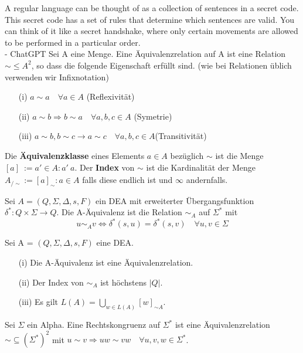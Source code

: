 {
  A regular language can be thought of as a collection of sentences in a secret code. This secret code has a set of rules that determine which sentences are valid. You can think of it like a secret handshake, where only certain movements are allowed to be performed in a particular order.\\ \hspace*{\fill} - ChatGPT
}
  Sei A eine Menge. Eine Äquivalenzrelation auf A ist eine Relation \(\sim \leq A^{2}\), so dass die folgende Eigenschaft erfüllt sind. (wie bei Relationen üblich verwenden wir Infixnotation)
  \begin{itemize}
    \item [(i)] \(a \sim a \quad \forall a \in A\)  (Reflexivität)
    \item [(ii)] \(a \sim b \Rightarrow  b \sim a \quad \forall a, b, c \in A\) (Symetrie)
    \item [(iii)] \(a \sim b, b \sim c \rightarrow a \sim c \quad \forall a, b, c \in A\)(Transitivität)
  \end{itemize}
  Die \textbf{Äquivalenzklasse} eines Elements \(a \in A\) bezüglich \(\sim\) ist die Menge \([a]_{~} := {a' \in A : a' ~a}\). Der \textbf{Index} von \(\sim\) ist die Kardinalität der Menge \(A_{/\sim} := {[a]_{\sim} : a \in A}\) falls diese endlich ist und \(\infty\) andernfalls.

  Sei \(A = (Q, \Sigma, \Delta, s, F)\) ein DEA mit erweiterter Übergangsfunktion \(\delta^{*}: Q \times \Sigma \rightarrow Q\). Die A-Äquivalenz ist die Relation \(\sim_A\) auf \(\Sigma^{*}\) mit 
\[
  u \sim_A v \Leftrightarrow \delta^*(s, u) = \delta^*(s,v) \quad \forall u, v \in \Sigma
\]

Sei A = \((Q, \Sigma, \Delta, s, F)\) eine DEA.
\begin{itemize}
  \item [(i)] Die A-Äquivalenz ist eine Äquivalenzrelation.
  \item [(ii)] Der Index von \(\sim_{A}\) ist höchstens \(|Q|\).
  \item [(iii)] Es gilt \(L(A) = \bigcup \limits_{w \in L(A)} [w]_{\sim A}\).
\end{itemize}

  Sei \(\Sigma\) ein Alpha. Eine Rechtskongruenz auf \(\Sigma^{*}\) ist eine Äquivalenzrelation \(\sim \subseteq (\Sigma^{*})^{2}\) mit \(u \sim v \Rightarrow uw \sim vw \quad \forall u, v, w \in \Sigma^{*}\).

